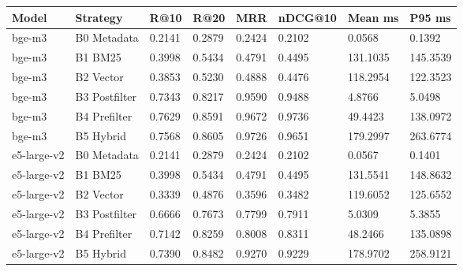 \begin{tabular}{llllllll}
\toprule
Model & Strategy & R@10 & R@20 & MRR & nDCG@10 & Mean ms & P95 ms \\
\midrule
bge-m3 & B0 Metadata & 0.2141 & 0.2879 & 0.2424 & 0.2102 & 0.0568 & 0.1392 \\
bge-m3 & B1 BM25 & 0.3998 & 0.5434 & 0.4791 & 0.4495 & 131.1035 & 145.3539 \\
bge-m3 & B2 Vector & 0.3853 & 0.5230 & 0.4888 & 0.4476 & 118.2954 & 122.3523 \\
bge-m3 & B3 Postfilter & 0.7343 & 0.8217 & 0.9590 & 0.9488 & 4.8766 & 5.0498 \\
bge-m3 & B4 Prefilter & 0.7629 & 0.8591 & 0.9672 & 0.9736 & 49.4423 & 138.0972 \\
bge-m3 & B5 Hybrid & 0.7568 & 0.8605 & 0.9726 & 0.9651 & 179.2997 & 263.6774 \\
e5-large-v2 & B0 Metadata & 0.2141 & 0.2879 & 0.2424 & 0.2102 & 0.0567 & 0.1401 \\
e5-large-v2 & B1 BM25 & 0.3998 & 0.5434 & 0.4791 & 0.4495 & 131.5541 & 148.8632 \\
e5-large-v2 & B2 Vector & 0.3339 & 0.4876 & 0.3596 & 0.3482 & 119.6052 & 125.6552 \\
e5-large-v2 & B3 Postfilter & 0.6666 & 0.7673 & 0.7799 & 0.7911 & 5.0309 & 5.3855 \\
e5-large-v2 & B4 Prefilter & 0.7142 & 0.8259 & 0.8008 & 0.8311 & 48.2466 & 135.0898 \\
e5-large-v2 & B5 Hybrid & 0.7390 & 0.8482 & 0.9270 & 0.9229 & 178.9702 & 258.9121 \\
\bottomrule
\end{tabular}
